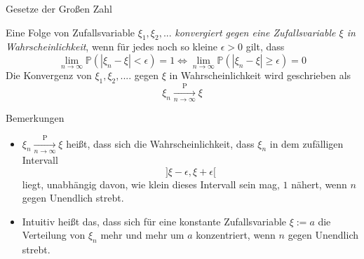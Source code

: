 \documentclass[
  8pt,
  ignorenonframetext,
]{beamer}
\providecommand{\tightlist}{%
  \setlength{\itemsep}{0pt}\setlength{\parskip}{0pt}}
\begin{document}
\begin{frame}{Gesetze der Großen Zahl}
\protect\hypertarget{gesetze-der-grouxdfen-zahl-1}{}
\small
\begin{definition}
\justifying
Eine Folge von Zufallsvariable $\xi_1,\xi_2,...$ \textit{konvergiert gegen eine Zufallsvariable $\xi$ in Wahrscheinlichkeit}, wenn für jedes noch so kleine $\epsilon > 0$ gilt, dass
\begin{equation}
\lim_{n \to \infty} \mathbb{P}(|\xi_n - \xi| < \epsilon)    = 1 \Leftrightarrow
\lim_{n \to \infty} \mathbb{P}(|\xi_n - \xi| \ge \epsilon)  = 0
\end{equation}
Die Konvergenz von $\xi_1,\xi_2,....$ gegen $\xi$ in Wahrscheinlichkeit wird geschrieben als
\begin{equation}
\xi_n\xrightarrow[n \to \infty]{\mbox{P}} \xi
\end{equation}
\end{definition}

\footnotesize

Bemerkungen

\begin{itemize}
\tightlist
\item
  \(\xi_n\xrightarrow[n \to \infty]{\text{P}} \xi\) heißt, dass sich die
  Wahrscheinlichkeit, dass \(\xi_n\) in dem zufälligen Intervall
  \begin{equation} 
  ]\xi-\epsilon, \xi+\epsilon[
  \end{equation} liegt, unabhängig davon, wie klein dieses Intervall
  sein mag, \(1\) nähert, wenn \(n\) gegen Unendlich strebt.
\item
  Intuitiv heißt das, dass sich für eine konstante Zufallsvariable
  \(\xi := a\) die Verteilung von \(\xi_n\) mehr und mehr um \(a\)
  konzentriert, wenn \(n\) gegen Unendlich strebt.
\end{itemize}
\end{frame}
\end{document}

